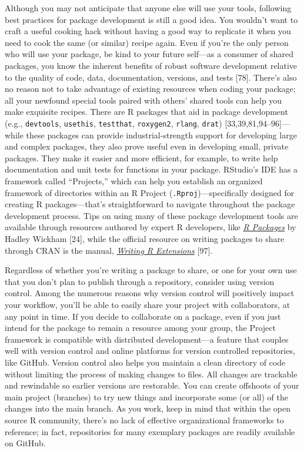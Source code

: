 \documentclass[10pt,letterpaper]{article}
\begin{document}
Although you may not anticipate that anyone else will use your tools,
following best practices for package development is still a good idea.
You wouldn't want to craft a useful cooking hack without having a good
way to replicate it when you need to cook the same (or similar) recipe
again. Even if you're the only person who will use your package, be kind
to your future self---as a consumer of shared packages, you know the
inherent benefits of robust software development relative to the quality
of code, data, documentation, versions, and tests {[}78{]}. There's also
no reason not to take advantage of existing resources when coding your
package; all your newfound special tools paired with others' shared
tools can help you make exquisite recipes. There are R packages that aid
in package development (e.g., \texttt{devtools}, \texttt{usethis},
\texttt{testthat}, \texttt{roxygen2}, \texttt{rlang}, \texttt{drat})
{[}33,39,81,94--96{]}---while these packages can provide
industrial-strength support for developing large and complex packages,
they also prove useful even in developing small, private packages. They
make it easier and more efficient, for example, to write help
documentation and unit tests for functions in your package. RStudio's
IDE has a framework called ``Projects,'' which can help you establish an
organized framework of directories within an R Project
(\texttt{.Rproj})---specifically designed for creating R
packages---that's straightforward to navigate throughout the package
development process. Tips on using many of these package development
tools are available through resources authored by expert R developers,
like \href{https://r-pkgs.org/}{\emph{R Packages}} by Hadley Wickham
{[}24{]}, while the official resource on writing packages to share
through CRAN is the manual,
\href{https://cran.r-project.org/doc/manuals/r-release/R-exts.html}{\emph{Writing
R Extensions}} {[}97{]}.

Regardless of whether you're writing a package to share, or one for your
own use that you don't plan to publish through a repository, consider
using version control. Among the numerous reasons why version control
will positively impact your workflow, you'll be able to easily share
your project with collaborators, at any point in time. If you decide to
collaborate on a package, even if you just intend for the package to
remain a resource among your group, the Project framework is compatible
with distributed development---a feature that couples well with version
control and online platforms for version controlled repositories, like
GitHub. Version control also helps you maintain a clean directory of
code without limiting the process of making changes to files. All
changes are trackable and rewindable so earlier versions are restorable.
You can create offshoots of your main project (branches) to try new
things and incorporate some (or all) of the changes into the main
branch. As you work, keep in mind that within the open source R
community, there's no lack of effective organizational frameworks to
reference; in fact, repositories for many exemplary packages are readily
available on GitHub.
\end{document}
